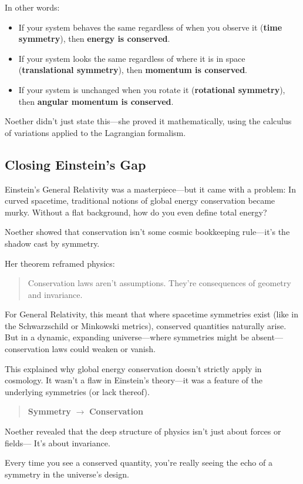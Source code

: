 In other words:

\begin{itemize}
  \item If your system behaves the same regardless of when you observe it (\textbf{time symmetry}), then \textbf{energy is conserved}.
  \item If your system looks the same regardless of where it is in space (\textbf{translational symmetry}), then \textbf{momentum is conserved}.
  \item If your system is unchanged when you rotate it (\textbf{rotational symmetry}), then \textbf{angular momentum is conserved}.
\end{itemize}

Noether didn’t just state this—she proved it mathematically, using the calculus of variations applied to the Lagrangian formalism.

\subsection{Closing Einstein’s Gap}

Einstein’s General Relativity was a masterpiece—but it came with a problem:  
In curved spacetime, traditional notions of global energy conservation became murky. Without a flat background, how do you even define total energy?

Noether showed that conservation isn’t some cosmic bookkeeping rule—it’s the shadow cast by symmetry.

Her theorem reframed physics:

\begin{quote}
Conservation laws aren’t assumptions.  
They’re consequences of geometry and invariance.
\end{quote}

For General Relativity, this meant that where spacetime symmetries exist (like in the Schwarzschild or Minkowski metrics), conserved quantities naturally arise. But in a dynamic, expanding universe—where symmetries might be absent—conservation laws could weaken or vanish.

This explained why global energy conservation doesn’t strictly apply in cosmology. It wasn’t a flaw in Einstein’s theory—it was a feature of the underlying symmetries (or lack thereof).

\begin{tcolorbox}[colback=blue!5!white, colframe=blue!50!black, title={Noether’s Theorem: Where Beauty Becomes Law}]
\begin{quote}
\textbf{Symmetry} $\rightarrow$ \textbf{Conservation}
\end{quote}

Noether revealed that the deep structure of physics isn’t just about forces or fields—  
It’s about invariance.  

Every time you see a conserved quantity, you're really seeing the echo of a symmetry in the universe’s design.
\end{tcolorbox}

